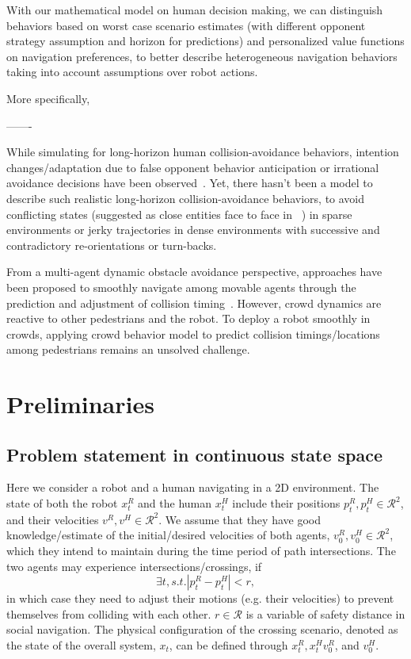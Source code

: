 \documentclass{article}
\begin{document}
With our mathematical model on human decision making, we can distinguish  behaviors based on worst case scenario estimates (with different opponent strategy assumption and horizon for predictions) and personalized value functions on navigation preferences, to better describe heterogeneous navigation behaviors taking into account assumptions over robot actions. 

More specifically,

-------

While simulating for long-horizon human collision-avoidance behaviors, intention changes/adaptation due to false opponent behavior anticipation or irrational avoidance decisions have been observed~\cite{paris2007pedestrian}. Yet, there hasn't been a model to describe such realistic long-horizon collision-avoidance behaviors, to avoid conflicting states (suggested as close entities face to face in ~\cite{paris2007pedestrian}) in sparse environments or jerky trajectories in dense environments with successive and contradictory re-orientations or turn-backs.

From a multi-agent dynamic obstacle avoidance perspective, approaches have been proposed to smoothly navigate among movable agents through the prediction and adjustment of collision timing~\cite{van2008reciprocal,van2011reciprocal}. However, crowd dynamics are reactive to other pedestrians and the robot. To deploy a robot smoothly in crowds, applying crowd behavior model to predict collision timings/locations among pedestrians remains an unsolved challenge.

\section{Preliminaries}
\subsection{Problem statement in continuous state space}
Here we consider a robot and a human navigating in a 2D environment. The state of both the robot $x^R_t$ and the human $x^H_t$ include their positions $p_t^R, p_t^H\in\mathcal{R}^2$, and their velocities $v^R, v^H\in \mathcal{R}^2$. We assume that they have good knowledge/estimate of the initial/desired velocities of both agents, $v_0^R,v_0^H\in \mathcal{R}^2$, which they intend to maintain during the time period of path intersections. The two agents may experience intersections/crossings, if
$$
\exists t, s.t. |p_t^R-p_t^H| < r,
$$
in which case they need to adjust their motions (e.g. their velocities) to prevent themselves from colliding with each other. $r\in \mathcal{R}$ is a variable of safety distance in social navigation. The physical configuration of the crossing scenario, denoted as the state of the overall system, $x_t$, can be defined through $x^R_t,x^H_t v_0^R$, and $v_0^H$. 
\end{document}

